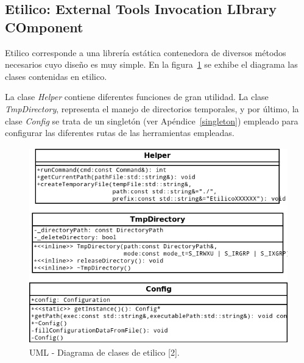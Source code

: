 \subsection{Etilico: External Tools Invocation LIbrary COmponent}
\par Etilico corresponde a una librería estática contenedora de diversos métodos necesarios cuyo diseño es muy simple. En la figura~\ref{disenioEtilico} se exhibe el diagrama las clases contenidas en etilico.
\par La clase \emph{Helper} contiene diferentes funciones de gran utilidad. La clase \emph{TmpDirectory}, representa el manejo de directorios temporales, y por último, la clase \emph{Config} se trata de un singletón (ver Apéndice~\ref{singleton}) empleado para configurar las diferentes rutas de las herramientas empleadas.

\begin{figure}[!hbtp]
	\begin{center}
		\includegraphics[width=13cm, height=8.5cm]{image/etilico.png}
		\caption{UML - Diagrama de clases de etilico [2].}
		\label{disenioEtilico}
	\end{center}
\end{figure}